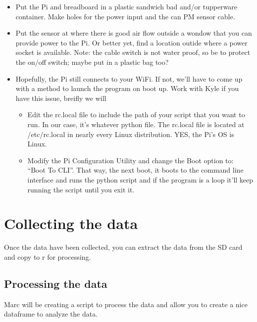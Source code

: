 \documentclass{article}\usepackage[]{graphicx}\usepackage[]{xcolor}
\begin{document}
\begin{itemize}
  \item Put the Pi and breadboard in a plastic sandwich bad and/or tupperware container. Make holes for the power input and the can PM sensor cable. 
  \item Put the sensor at where there is good air flow outside a wondow that you can provide power to the Pi. Or better yet, find a location outide where a power socket is available.  Note: the cable switch is not water proof, so be to protect the on/off switch; maybe put in a plastic bag too?
  \item Hopefully, the Pi still connects to your WiFi. If not, we'll have to come up with a method to launch the program on boot up. Work with Kyle if you have this issue, breifly we will 
  
\begin{itemize}
  \item Edit the rc.local file to include the path of your script that you want to run. In our case, it's whatever python file. The rc.local file is located at /etc/rc.local in nearly every Linux distribution. YES, the Pi's OS is Linux.
  \item Modify the Pi Configuration Utility and change the Boot option to: ``Boot To CLI''. That way, the next boot, it boots to the command line interface and runs the python script and if the program is a loop it'll keep running the script until you exit it.
  
\end{itemize}


\end{itemize}


\section{Collecting the data}

Once the data have been collected, you can extract the data from the SD card and copy to r for processing. 

\subsection{Processing the data}

Marc will be creating a script to process the data and allow you to create a nice dataframe to analyze the data.
\end{document}
